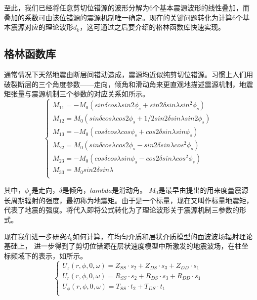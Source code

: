 至此，我们已经将任意剪切位错源的波形分解为6个基本震源波形的线性叠加，而叠加的系数可由该位错源的震源机制唯一确定。现在的关键问题转化为计算6个基本震源对应的理论波形$d_k$，这可通过之后要介绍的格林函数库快速实现。

\subsection{格林函数库}

通常情况下天然地震由断层间错动造成，震源均近似纯剪切位错源。习惯上人们用破裂断层的三个角度参数——走向，倾角和滑动角来更直观地描述震源机制，地震矩张量与震源机制三个参数的对应关系如所示\citep{Aki1980}。
\begin{equation}
\label{eq2_09}
\left\{
    \begin{array}{l}
    M_{11}=-M_0(sin{\delta}cos{\lambda}sin{2\phi_s}+sin{2\delta}sin{\lambda}sin^2{\phi_s})\\
    M_{12}=M_0(sin{\delta}cos{\lambda}cos{2\phi_s}+1/2sin{2\delta}sin{\lambda}sin{2\phi_s})\\
    M_{13}=-M_0(cos{\delta}cos{\lambda}cos{\phi_s}+cos{2\delta}sin{\lambda}sin{\phi_s})\\
    M_{22}=M_0(sin{\delta}cos{\lambda}cos{2\phi_s}-sin{2\delta}sin{\lambda}cos^2{\phi_s})\\
    M_{23}=-M_0(cos{\delta}cos{\lambda}sin{\phi_s}-cos{2\delta}sin{\lambda}cos^2{\phi_s})\\
    M_{33}=M_0sin{2\delta}sin{\lambda}\\
    \end{array}
\right.
\end{equation}

其中，$\phi_s$是走向，$\delta$是倾角，$lambda$是滑动角。 $M_0$是最早由\citet{Aki1966}提出的用来度量震源长周期辐射的强度，最初称为地震矩。由于是一个标量，现在又叫作标量地震矩，代表了地震的强度。将代入即将公式转化为了理论波形关于震源机制三参数的形式。

现在我们进一步研究$d_k$如何计算，在均匀介质\citep{Ben-Menahem1963}和层状介质\citep{Haskell1964}模型的面波波场辐射理论基础上，\citet{Wang1980} 进一步得到了剪切位错源在层状速度模型中所激发的地震波场，在柱坐标频域下的表示，如所示。
\begin{equation}
\label{eq2_10}
\left\{
    \begin{array}{l}
    U_z(r,\phi,0,\omega)=Z_{SS}{\cdot}s_2+Z_{DS}{\cdot}s_3+Z_{DD}{\cdot}s_1\\
    U_r(r,\phi,0,\omega)=R_{SS}{\cdot}s_2+R_{DS}{\cdot}s_3+R_{DD}{\cdot}s_1\\
    U_{\phi}(r,\phi,0,\omega)=T_{SS}{\cdot}t_2+T_{DS}{\cdot}t_1\\
    \end{array}
\right.
\end{equation}

